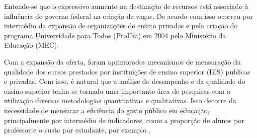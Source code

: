 
Entende-se que o expressivo aumento na destinação de recursos está associado à influência do governo federal na criação de vagas. De acordo com  isso ocorreu por intermédio da expansão de organizações de ensino privadas e pela criação do programa Universidade para Todos (ProUni) em 2004 pelo Ministério da Educação (MEC).




Com a expansão da oferta, foram aprimorados mecanismos de mensuração da qualidade dos cursos prestados por instituições de ensino superior (IES) publicas e privadas. Com isso, é natural que a análise do desempenho e da qualidade do ensino superior tenha se tornado uma importante área de pesquisas com a utilização diversas metodologias quantitativas e qualitativas. Isso decorre da necessidade de mensurar a eficiência do gasto público em educação, principalmente por intermédio de indicadores, como a proporção de alunos por professor e o custo por estudante, por exemplo \cite[p.~417]{Costa_Souza_Ramos_Silva_2012}.


